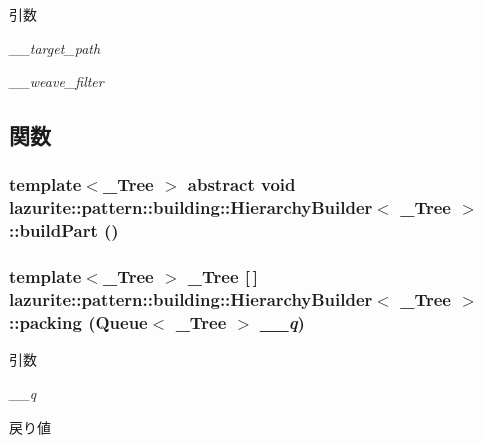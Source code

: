 \begin{DoxyParams}{引数}
\item[{\em \_\-\_\-target\_\-path}]\item[{\em \_\-\_\-weave\_\-filter}]\end{DoxyParams}


\subsection{関数}
\hypertarget{classlazurite_1_1pattern_1_1building_1_1_hierarchy_builder_3_01___tree_01_4_a388c372979909c24afe69939be511c33}{
\subsubsection[{buildPart}]{\setlength{\rightskip}{0pt plus 5cm}template$<$\_\-Tree $>$ abstract void lazurite::pattern::building::HierarchyBuilder$<$ \_\-Tree $>$::buildPart ()}}
\label{classlazurite_1_1pattern_1_1building_1_1_hierarchy_builder_3_01___tree_01_4_a388c372979909c24afe69939be511c33}
\hypertarget{classlazurite_1_1pattern_1_1building_1_1_hierarchy_builder_3_01___tree_01_4_a5440abb1c9c6480b24e4c31fae434c3c}{
\subsubsection[{packing}]{\setlength{\rightskip}{0pt plus 5cm}template$<$\_\-Tree $>$ \_\-Tree \mbox{[}$\,$\mbox{]} lazurite::pattern::building::HierarchyBuilder$<$ \_\-Tree $>$::packing (Queue$<$ \_\-Tree $>$ {\em \_\-\_\-q})}}
\label{classlazurite_1_1pattern_1_1building_1_1_hierarchy_builder_3_01___tree_01_4_a5440abb1c9c6480b24e4c31fae434c3c}

\begin{DoxyParams}{引数}
\item[{\em \_\-\_\-q}]\end{DoxyParams}
\begin{DoxyReturn}{戻り値}

\end{DoxyReturn}


